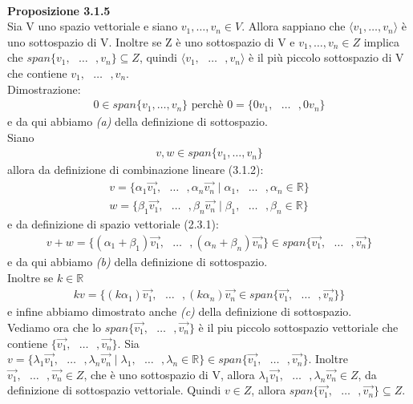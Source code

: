 \documentclass{article}
\begin{document}
\textbf{\\Proposizione 3.1.5}
\\ Sia V uno spazio vettoriale e siano \(v_1, \dots, v_n \in V\).  Allora sappiano che $\langle v_1, \dots, v_n\rangle$ è uno sottospazio di V.  
Inoltre se Z è uno sottospazio di V e \(v_1, \dots, v_n \in Z\) implica che $span\{v_1, \text{ } \dots \text{ }, v_n\} \subseteq Z$, quindi $\langle v_1, \text{ } \dots \text{ }, v_n \rangle$ è il più piccolo sottospazio di V che contiene $v_1, \text{ }\dots\text{ }, v_n$.
\vspace{3px}
\\Dimostrazione:
\begin{align*}
  0 \in span\{v_1, \dots, v_n \} \text{ perchè } 0 = \{0v_1, \text{ } \dots \text{ }, 0v_n\}
\end{align*}
e da qui abbiamo \textit{(a)} della definizione di sottospazio.
\\Siano
\begin{align*}
  v,w \in span\{v_1, \dots, v_n\}
\end{align*}
allora da definizione di combinazione lineare (3.1.2):
\begin{align*}
  v = \{\alpha_1 \vec{v_1}, \text{ }\dots\text{ }, \alpha_n \vec{v_n} \mid \alpha_1, \text{ }\dots\text{ }, \alpha_n \in \mathbb{R}\}
  \\   w = \{\beta_1 \vec{v_1}, \text{ }\dots\text{ }, \beta_n \vec{v_n} \mid \beta_1, \text{ }\dots\text{ }, \beta_n \in \mathbb{R}\}
\end{align*}
e da definizione di spazio vettoriale (2.3.1):
\begin{align*}
  v+w=\{(\alpha_1+\beta_1)\vec{v_1}, \text{ }\dots\text{ }, (\alpha_n+\beta_n)\vec{v_n}\} \in span\{\vec{v_1}, \text{ }\dots\text{ }, \vec{v_n}\}
\end{align*}
e da qui abbiamo \textit{(b)} della definizione di sottospazio.
\\ Inoltre se $k \in \mathbb{R}$
\begin{align*}
  kv=\{(k\alpha_1)\vec{v_1},\text{ }\dots\text{ },(k\alpha_n)\vec{v_n} \in span\{\vec{v_1}, \text{ }\dots\text{ }, \vec{v_n}\}\}
\end{align*}
e infine abbiamo dimostrato anche \textit{(c)} della definizione di sottospazio.
\\Vediamo ora che lo $span\{\vec{v_1}, \text{ }\dots\text{ }, \vec{v_n}\}$ è il piu piccolo sottospazio vettoriale che contiene $\{\vec{v_1}, \text{ }\dots\text{ }, \vec{v_n}\}$.
Sia $v=\{\lambda_1\vec{v_1},\text{ }\dots\text{ },\lambda_n\vec{v_n} \mid \lambda_1,\text{ }\dots\text{ },\lambda_n\in \mathbb{R} \} \in span\{\vec{v_1},\text{ }\dots\text{ },\vec{v_n}\}$.
Inoltre $\vec{v_1},\text{ }\dots\text{ },\vec{v_n} \in Z$, che è uno sottospazio di V, allora $\lambda_1\vec{v_1},\text{ }\dots\text{ },\lambda_n\vec{v_n} \in Z$, da definizione di sottospazio vettoriale. Quindi $v\in Z$, allora $span\{\vec{v_1},\text{ }\dots\text{ },\vec{v_n}\} \subseteq Z$.
\end{document}
